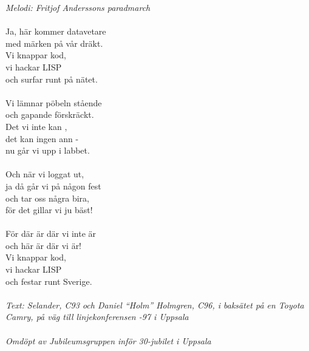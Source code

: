 {\footnotesize\textit{Melodi: Fritjof Anderssons paradmarch}}\\
\\
Ja, här kommer datavetare\\
med märken på vår dräkt.\\
Vi knappar kod, \\
vi hackar LISP\\
och surfar runt på nätet.\\
\\
Vi lämnar pöbeln stående\\
och gapande förskräckt.\\
Det vi inte kan , \\
det kan ingen ann -\\
nu går vi upp i labbet.\\
\\
Och när vi loggat ut,\\
ja då går vi på någon fest\\
och tar oss några bira,\\
för det gillar vi ju bäst!\\
\\
För där är där vi inte är\\
och här är där vi är!\\
Vi knappar kod,\\
vi hackar LISP\\
och festar runt Sverige.\\
\\
{\footnotesize\textit{Text: Selander, C93 och Daniel “Holm” Holmgren,
    C96, i baksätet på en Toyota Camry, på väg till linjekonferensen
    -97 i Uppsala\\ \\ Omdöpt av Jubileumsgruppen inför 30-jubilet i
    Uppsala}}
